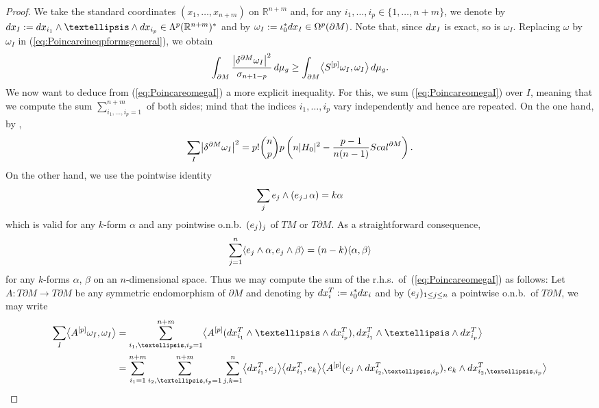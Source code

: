 \documentclass[11pt]{article}
\numberwithin{equation}{section}
\numberwithin{equation}{section}
\begin{document}
\begin{proof}
We take the standard coordinates $(x_1,\dots,x_{n+m})$ on $\mathbb{R}^{n+m}$ and, for any $i_1,\dots,i_p\in\{1,\dots,n+m\}$, we denote by ${\rm d}x_I:={\rm d}x_{i_1}\wedge\dots\wedge {\rm d}x_{i_p}\in\Lambda^p(\mathbb{R}^{n+m})^*$ and by $\omega_I:=\iota_0^* {\rm d}x_I\in\Omega^p(\partial M)$. Note that, since ${\rm d}x_I$ is exact, so is $\omega_I$.
Replacing $\omega$ by $\omega_I$ in (\ref{eq:Poincareineqpformsgeneral}), we obtain
\begin{equation}\label{eq:PoincareomegaI}
\int_{\partial M}\frac{\bigl|\delta^{\partial M}\omega_I\bigr|^2}{\sigma_{n+1-p}}\,{\rm d}\mu_g\geq\int_{\partial M}\bigl\langle S^{[p]}\omega_I,\omega_I\bigr\rangle\,{\rm d}\mu_g.
\end{equation}
We now want to deduce from (\ref{eq:PoincareomegaI}) a more explicit i\-ne\-qua\-li\-ty. For this, we sum (\ref{eq:PoincareomegaI}) over $I$, meaning that we compute the sum $\sum_{i_1,\dots,i_p=1}^{n+m}$ of both sides; mind that the indices $i_1,\dots,i_p$ vary independently and hence are repeated. On the one hand, by \cite[Lemma 2.2]{Savo05},
\begin{equation}\label{eq:sumdeltaomegaI2}
\sum_I\bigl|\delta^{\partial M}\omega_I\bigr|^2=p!\binom{n}{p}p\left(n|H_0|^2-\frac{p-1}{n(n-1)}{\rm Scal}^{\partial M}\right).
\end{equation}
On the other hand, we use the pointwise identity
\[\sum_{j}{\rm e}_j\wedge({\rm e}_j\lrcorner\,\alpha)=k\alpha\]
which is valid for any $k$-form $\alpha$ and any pointwise o.n.b.\ $({\rm e}_j)_j$ of $TM$ or $T\partial M$.
As a straightforward consequence,
\begin{equation*}
\sum_{j=1}^n\langle {\rm e}_j\wedge\alpha,{\rm e}_j\wedge\beta\rangle=(n-k)\langle\alpha,\beta\rangle
\end{equation*}
for any $k$-forms $\alpha$, $\beta$ on an $n$-dimensional space. Thus we may compute the sum of the r.h.s.\ of~(\ref{eq:PoincareomegaI}) as follows:  Let $A\colon T\partial M\to T\partial M$ be any symmetric endomorphism of $\partial M$  and denoting by ${\rm d}x_i^T:=\iota_0^*{\rm d}x_i$ and by $({\rm e}_j)_{1\leq j\leq n}$ a pointwise o.n.b.\ of $T\partial M$, we may write
\begin{align}
\sum_I\bigl\langle A^{[p]}\omega_I,\omega_I\bigr\rangle&= \sum_{i_1,\dots,i_p=1}^{n+m}\bigl\langle A^{[p]}({\rm d}x_{i_1}^T\wedge\dots\wedge {\rm d}x_{i_p}^T),{\rm d}x_{i_1}^T\wedge\dots\wedge {\rm d}x_{i_p}^T\bigr\rangle\nonumber\\
&= \sum_{i_1=1}^{n+m}\sum_{i_2,\dots,i_p=1}^{n+m}\sum_{j,k=1}^n\bigl\langle {\rm d}x_{i_1}^T,{\rm e}_j\bigr\rangle\bigl\langle {\rm d}x_{i_1}^T,{\rm e}_k\bigr\rangle\bigl\langle A^{[p]}({\rm e}_j\wedge {\rm d}x_{i_2,\dots,i_p}^T),{\rm e}_k\wedge {\rm d}x_{i_2,\dots,i_p}^T\bigr\rangle\nonumber\\

\end{align}
\end{proof}
\end{document}
